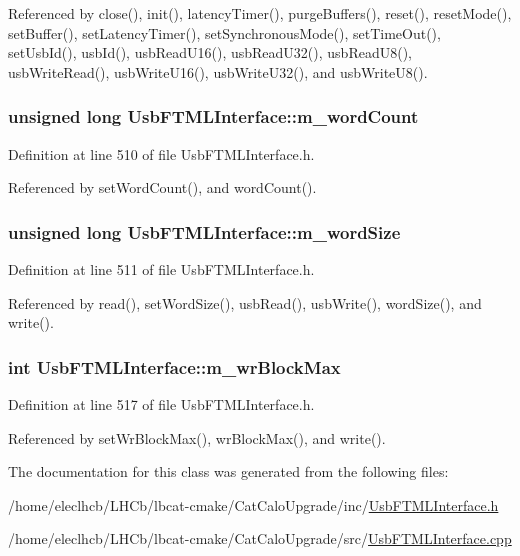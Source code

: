 Referenced by close(), init(), latencyTimer(), purgeBuffers(), reset(), resetMode(), setBuffer(), setLatencyTimer(), setSynchronousMode(), setTimeOut(), setUsbId(), usbId(), usbReadU16(), usbReadU32(), usbReadU8(), usbWriteRead(), usbWriteU16(), usbWriteU32(), and usbWriteU8().\hypertarget{classUsbFTMLInterface_ab7f4399ef367c08ffe1f7034f133986e}{
\subsubsection[{m\_\-wordCount}]{\setlength{\rightskip}{0pt plus 5cm}unsigned long {\bf UsbFTMLInterface::m\_\-wordCount}}}
\label{classUsbFTMLInterface_ab7f4399ef367c08ffe1f7034f133986e}


Definition at line 510 of file UsbFTMLInterface.h.

Referenced by setWordCount(), and wordCount().\hypertarget{classUsbFTMLInterface_a39a8dfbe54cc29e033fa2a4d5fbbc982}{
\subsubsection[{m\_\-wordSize}]{\setlength{\rightskip}{0pt plus 5cm}unsigned long {\bf UsbFTMLInterface::m\_\-wordSize}}}
\label{classUsbFTMLInterface_a39a8dfbe54cc29e033fa2a4d5fbbc982}


Definition at line 511 of file UsbFTMLInterface.h.

Referenced by read(), setWordSize(), usbRead(), usbWrite(), wordSize(), and write().\hypertarget{classUsbFTMLInterface_adb3d6b099e8283d80360f78fab064285}{
\subsubsection[{m\_\-wrBlockMax}]{\setlength{\rightskip}{0pt plus 5cm}int {\bf UsbFTMLInterface::m\_\-wrBlockMax}}}
\label{classUsbFTMLInterface_adb3d6b099e8283d80360f78fab064285}


Definition at line 517 of file UsbFTMLInterface.h.

Referenced by setWrBlockMax(), wrBlockMax(), and write().

The documentation for this class was generated from the following files:\begin{DoxyCompactItemize}
\item 
/home/eleclhcb/LHCb/lbcat-\/cmake/CatCaloUpgrade/inc/\hyperlink{UsbFTMLInterface_8h}{UsbFTMLInterface.h}\item 
/home/eleclhcb/LHCb/lbcat-\/cmake/CatCaloUpgrade/src/\hyperlink{UsbFTMLInterface_8cpp}{UsbFTMLInterface.cpp}\end{DoxyCompactItemize}
